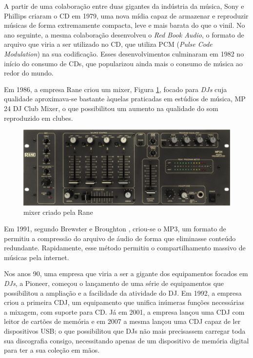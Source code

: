 A partir de uma colaboração entre duas gigantes da indústria da música, Sony e Phillips criaram o CD em 1979, uma nova mídia capaz de armazenar e reproduzir músicas de forma extremamente compacta, leve e mais barata do que o vinil. No ano seguinte, a mesma colaboração desenvolveu o \textit{Red Book Audio}, o formato de arquivo que viria a ser utilizado no CD, que utiliza PCM (\textit{Pulse Code Modulation}) na sua codificação. Esses desenvolvimentos culminaram em 1982 no início do consumo de CDs, que popularizou ainda mais o consumo de música ao redor do mundo.

Em 1986, a empresa Rane criou um mixer, Figura \ref{fig15}, focado para \textit{DJs} cuja qualidade aproximava-se bastante àquelas praticadas em estúdios de música, MP 24 DJ Club Mixer, o que possibilitou um aumento na qualidade do som reproduzido em clubes.
\begin{figure}[h]
	\centering
    \includegraphics[scale=0.3]{figuras/fig15.eps}
	\caption{mixer criado pela Rane \cite{ranecommercialMixerEvolution}}
	\label{fig15}
\end{figure}

\par
Em 1991, segundo  Brewster e Broughton \cite{lastnight}, criou-se o MP3, um formato de permitiu a compressão do arquivo de áudio de forma que eliminasse conteúdo redundante. Rapidamente, esse método permitiu o compartilhamento massivo de músicas pela internet.


Nos anos 90, uma empresa que viria a ser a gigante dos equipamentos focados em \textit{DJs}, a Pioneer, começou o lançamento de uma série de equipamentos que possibilitou a ampliação e a facilidade da atividade do DJ. Em 1992, a empresa criou a primeira CDJ, um equipamento que unifica inúmeras funções necessárias a mixagem, com suporte para CD. Já em 2001, a empresa lançou uma CDJ com leitor de cartões de memória e em 2007 a mesma lançou uma CDJ capaz de ler dispositivos USB; o que possibilitou que DJs não mais precisassem carregar toda sua discografia consigo, necessitando apenas de um dispositivo de memória digital para ter a sua coleção em mãos.

